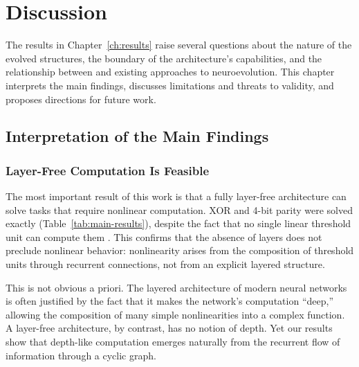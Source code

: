 
\chapter{Discussion}
\label{ch:discussion}

The results in Chapter~\ref{ch:results} raise several questions about
the nature of the evolved structures, the boundary of the
architecture's capabilities, and the relationship between \modnet{}
and existing approaches to neuroevolution. This chapter interprets
the main findings, discusses limitations and threats to validity, and
proposes directions for future work.

\section{Interpretation of the Main Findings}
\label{sec:interpretation}

\subsection{Layer-Free Computation Is Feasible}
\label{sec:interpretation-layer-free}

The most important result of this work is that a fully layer-free
architecture can solve tasks that require nonlinear computation. XOR
and 4-bit parity were solved exactly (Table~\ref{tab:main-results}),
despite the fact that no single linear threshold unit can compute
them \citep{minsky1969perceptrons}. This confirms that the absence of
layers does not preclude nonlinear behavior: nonlinearity arises from
the composition of threshold units through recurrent connections, not
from an explicit layered structure.

This is not obvious a priori. The layered architecture of modern
neural networks is often justified by the fact that it makes the
network's computation ``deep,'' allowing the composition of many
simple nonlinearities into a complex function. A layer-free
architecture, by contrast, has no notion of depth. Yet our results
show that depth-like computation emerges naturally from the recurrent
flow of information through a cyclic graph.

